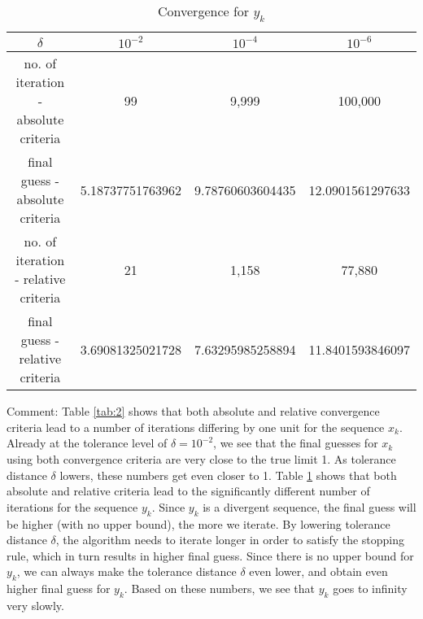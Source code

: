 \documentclass[11pt]{article}
\newcommand{\1}{\mathbbm{1}}
\begin{document}
	\begin{table}[h]
	\centering
	\begin{tabular}{|c | c | c | c |}
		\hline
		\hline
		$\delta	$							&$10^{-2}$ 			&$10^{-4}$ 			&$10^{-6}$          \\
		\hline
		no. of iteration - absolute criteria&99					&9,999				&100,000 \\
		final guess - absolute criteria		&5.18737751763962	&9.78760603604435	&12.0901561297633\\
		no. of iteration - relative criteria&21					&1,158				&77,880 \\
		final guess - relative criteria		&3.69081325021728	&7.63295985258894	&11.8401593846097\\
		\hline
		\hline
		\end{tabular} 
	\caption{Convergence for $y_k$}
	\label{tab:3}
\end{table}

Comment: Table \ref{tab:2} shows that both absolute and relative convergence criteria lead to a number of iterations differing by one unit for the sequence $x_k$. Already at the tolerance level of $\delta=10^{-2}$, we see that the final guesses for $x_k$ using both convergence criteria are very close to the true limit 1. As tolerance distance $\delta$ lowers, these numbers get even closer to 1. Table \ref{tab:3} shows that both absolute and relative criteria lead to the significantly different number of iterations for the sequence $y_k$. Since $y_k$ is a divergent sequence, the final guess will be higher (with no upper bound), the more we iterate. By lowering tolerance distance $\delta$, the algorithm needs to iterate longer in order to satisfy the stopping rule, which in turn results in higher final guess. Since there is no upper bound for $y_k$, we can always make the tolerance distance $\delta$ even lower, and obtain even higher final guess for $y_k$. Based on these numbers, we see that $y_k$ goes to infinity very slowly. 
\end{document}
